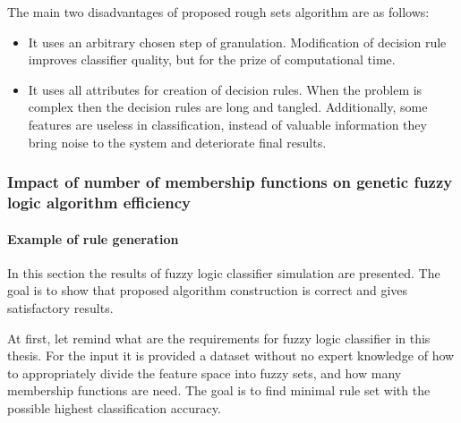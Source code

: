 The main two disadvantages of proposed rough sets algorithm are as follows:
\begin{itemize}
    \item It uses an arbitrary chosen step of granulation. Modification of
        decision rule improves classifier quality, but for the prize of
        computational time. 
    \item It uses all attributes for creation of decision rules. When the
        problem is complex then the decision rules are long and tangled. 
        Additionally, some features are useless in classification, instead of valuable
        information they bring noise to the system and deteriorate final results.
\end{itemize}

\subsubsection{Impact of number of membership functions on genetic fuzzy logic algorithm efficiency}
\label{cha:Simulation_reaearch_3}
\paragraph{Example of rule generation}

In this section the results of fuzzy logic classifier simulation are presented.
The goal is to show that proposed algorithm construction is correct and gives
satisfactory results. 

At first, let remind what are the requirements for fuzzy logic classifier in
this thesis. For the input it is provided a dataset without no expert knowledge 
of how to appropriately divide the feature space into fuzzy sets, and how many membership
functions are need. The goal is to find minimal rule set with the possible highest
classification accuracy. 

